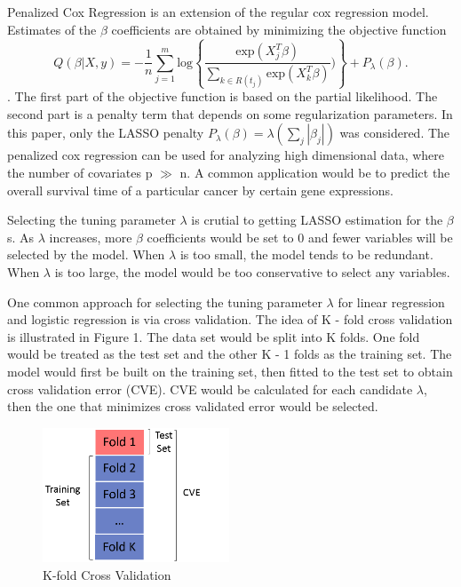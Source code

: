 \documentclass{article}\usepackage[]{graphicx}\usepackage[]{color}
\begin{document}
Penalized Cox Regression is an extension of the regular cox regression model. Estimates of the $\beta$ coefficients are obtained by minimizing the objective function \begin{equation}  Q(\beta |X, y) = - \frac{1}{n}  \sum_{j=1}^{m} \text{log} \left \{\frac{\text{exp} ( X_{j}^{T} \beta)}{\sum_{ k \in R(t_{j})}\text{exp} ( X_{k}^{T} \beta)}) \right \} + P_{\lambda}(\beta). \end{equation} \citep{Simon2011}. The first part of the objective function is based on the partial likelihood. The second part is a penalty term that depends on some regularization parameters. In this paper, only the LASSO penalty $P_{\lambda}(\beta) = \lambda (\sum_{j} |\beta_{j}|)$ was considered. The penalized cox regression can be used for analyzing high dimensional data, where the number of covariates p $\gg$ n. A common application would be to predict the overall survival time of a particular cancer by certain gene expressions.

Selecting the tuning parameter $\lambda$ is crutial to getting LASSO estimation for the $\beta$s. As $\lambda$ increases, more $\beta$ coefficients would be set to 0 and fewer variables will be selected by the model. When $\lambda$ is too small, the model tends to be redundant. When $\lambda$ is too large, the model would be too conservative to select any variables.

One common approach for selecting the tuning parameter $\lambda$ for linear regression and logistic regression is via cross validation. The idea of K - fold cross validation is illustrated in Figure 1. The data set would be split into K folds. One fold would be treated as the test set and the other K - 1 folds as the training set. The model would first be built on the training set, then fitted to the test set to obtain cross validation error (CVE).  CVE would be calculated for each candidate $\lambda$, then the one that minimizes cross validated error would be selected.

\begin{figure}
    \centering
		\includegraphics[height= 4cm ]{./figures/cv.png}	
    \caption{K-fold Cross Validation}
\end{figure}	
\end{document}

